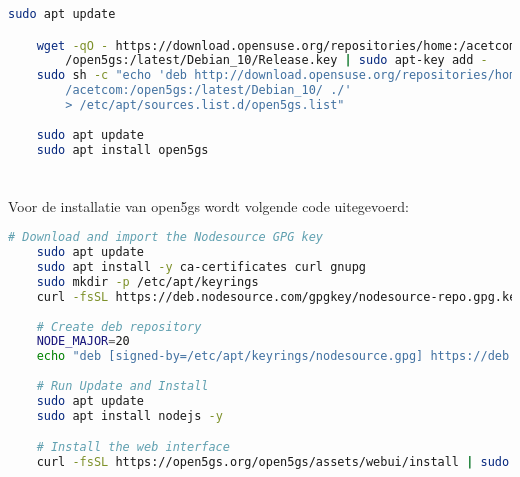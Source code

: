 
\begin{lstlisting}[language=Bash, caption=Installatie van Open5GS]
    sudo apt update

    wget -qO - https://download.opensuse.org/repositories/home:/acetcom:
        /open5gs:/latest/Debian_10/Release.key | sudo apt-key add -
    sudo sh -c "echo 'deb http://download.opensuse.org/repositories/home:
        /acetcom:/open5gs:/latest/Debian_10/ ./' 
        > /etc/apt/sources.list.d/open5gs.list"
    
    sudo apt update
    sudo apt install open5gs
\end{lstlisting}

\section{}

Voor de installatie van \gls{open5gs} wordt volgende code uitegevoerd:

\begin{lstlisting}[language=Bash, caption=Installatie van web-interface]
    # Download and import the Nodesource GPG key
    sudo apt update
    sudo apt install -y ca-certificates curl gnupg
    sudo mkdir -p /etc/apt/keyrings
    curl -fsSL https://deb.nodesource.com/gpgkey/nodesource-repo.gpg.key | sudo gpg --dearmor -o /etc/apt/keyrings/nodesource.gpg
    
    # Create deb repository
    NODE_MAJOR=20
    echo "deb [signed-by=/etc/apt/keyrings/nodesource.gpg] https://deb.nodesource.com/node_$NODE_MAJOR.x nodistro main" | sudo tee /etc/apt/sources.list.d/nodesource.list
    
    # Run Update and Install
    sudo apt update
    sudo apt install nodejs -y

    # Install the web interface
    curl -fsSL https://open5gs.org/open5gs/assets/webui/install | sudo -E bash -
\end{lstlisting}

\section{}



